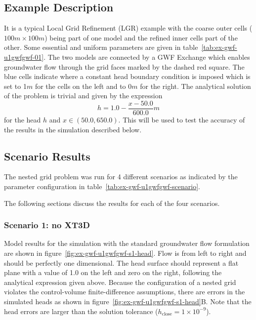 \subsection{Example Description}
It is a typical Local Grid Refinement (LGR) example with the coarse outer cells ($100 m \times 100 m$) being part of one model and the refined inner cells part of the other. Some essential and uniform parameters are given in table~\ref{tab:ex-gwf-u1gwfgwf-01}. The two models are connected by a GWF Exchange which enables groundwater flow through the grid faces marked by the dashed red square. The blue cells indicate where a constant head boundary condition is imposed which is set to 1$m$ for the cells on the left and to 0$m$ for the right. The analytical solution of the problem is trivial and given by the expression
\begin{equation}
	h = 1.0 - \frac{x - 50.0}{600.0} m
\end{equation}
for the head $h$ and $x \in (50.0,650.0)$. This will be used to test the accuracy of the results in the simulation described below.
                               



\subsection{Scenario Results}

The nested grid problem was run for 4 different scenarios as indicated by the parameter configuration in table~\ref{tab:ex-gwf-u1gwfgwf-scenario}.  




The following sections discuss the results for each of the four scenarios.


\subsubsection{Scenario 1: no XT3D}

Model results for the simulation with the standard groundwater flow formulation are shown in figure~\ref{fig:ex-gwf-u1gwfgwf-s1-head}. Flow is from left to right and should be perfectly one dimensional. The head surface should represent a flat plane with a value of 1.0 on the left and zero on the right, following the analytical expression given above. Because the configuration of a nested grid violates the control-volume finite-difference assumptions, there are errors in the simulated heads as shown in figure~\ref{fig:ex-gwf-u1gwfgwf-s1-head}B.  Note that the head errors are larger than the solution tolerance ($h_\textrm{close}=1 \times 10^{-9}$).


